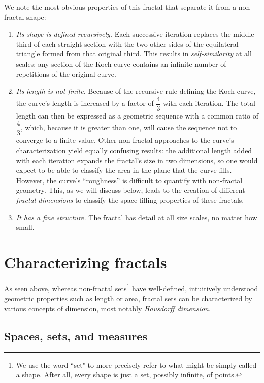 We note the most obvious properties of this fractal that separate it from a non-fractal shape:
\begin{enumerate}
\item \textit{Its shape is defined recursively.} Each successive iteration replaces the middle third of each straight section with the two other sides of the equilateral triangle formed from that original third. This results in \textit{self-similarity} at all scales: any section of the Koch curve contains an infinite number of repetitions of the original curve.
\item \textit{Its length is not finite.} Because of the recursive rule defining the Koch curve, the curve's length is increased by a factor of $ \dfrac{4}{3} $ with each iteration. The total length can then be expressed as a geometric sequence with a common ratio of $ \dfrac{4}{3} $, which, because it is greater than one, will cause the sequence not to converge to a finite value. Other non-fractal approaches to the curve's characterization yield equally confusing results: the additional length added with each iteration expands the fractal's size in two dimensions, so one would expect to be able to classify the area in the plane that the curve fills. However, the curve's ``roughness'' is difficult to quantify with non-fractal geometry. This, as we will discuss below, leads to the creation of different \textit{fractal dimensions} to classify the space-filling properties of these fractals.
\item \textit{It has a fine structure.} The fractal has detail at all size scales, no matter how small\citep{fractaltextbook}.
\end{enumerate}


\section{Characterizing fractals}

As seen above, whereas non-fractal sets\footnote{We use the word ``set" to more precisely refer to what might be simply called a shape. After all, every shape is just a set, possibly infinite, of points.}  have well-defined, intuitively understood geometric properties such as length or area, fractal sets can be characterized by various concepts of dimension, most notably \textit{Hausdorff dimension}.

\subsection{Spaces, sets, and measures}

